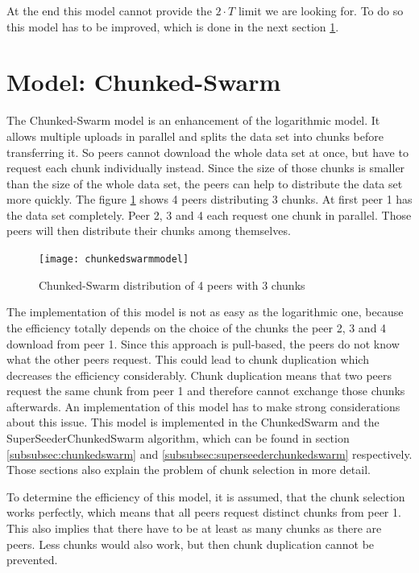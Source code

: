 At the end this model cannot provide the $2 \cdot T$ limit we are looking for. To do so this model has to be improved, which is done in the next section \ref{subsubsec:chunkedswarmmodel}.


\section{Model: Chunked-Swarm}
\label{subsubsec:chunkedswarmmodel}
The Chunked-Swarm model is an enhancement of the logarithmic model. It allows multiple uploads in parallel and splits the data set into chunks before transferring it. So peers cannot download the whole data set at once, but have to request each chunk individually instead. Since the size of those chunks is smaller than the size of the whole data set, the peers can help to distribute the data set more quickly. The figure \ref{fig:chunkedswarmmodel} shows 4 peers distributing 3 chunks. At first peer 1 has the data set completely. Peer 2, 3 and 4 each request one chunk in parallel. Those peers will then distribute their chunks among themselves.

\begin{figure}[H]
\centering
\texttt{[image: chunkedswarmmodel]}
\caption{Chunked-Swarm distribution of 4 peers with 3 chunks}
\label{fig:chunkedswarmmodel}
\end{figure}

The implementation of this model is not as easy as the logarithmic one, because the efficiency totally depends on the choice of the chunks the peer 2, 3 and 4 download from peer 1. Since this approach is pull-based, the peers do not know what the other peers request. This could lead to chunk duplication which decreases the efficiency considerably. Chunk duplication means that two peers request the same chunk from peer 1 and therefore cannot exchange those chunks afterwards. An implementation of this model has to make strong considerations about this issue. This model is implemented in the ChunkedSwarm and the SuperSeederChunkedSwarm algorithm, which can be found in section \ref{subsubsec:chunkedswarm} and \ref{subsubsec:superseederchunkedswarm} respectively. Those sections also explain the problem of chunk selection in more detail.

To determine the efficiency of this model, it is assumed, that the chunk selection works perfectly, which means that all peers request distinct chunks from peer 1. This also implies that there have to be at least as many chunks as there are peers. Less chunks would also work, but then chunk duplication cannot be prevented.

